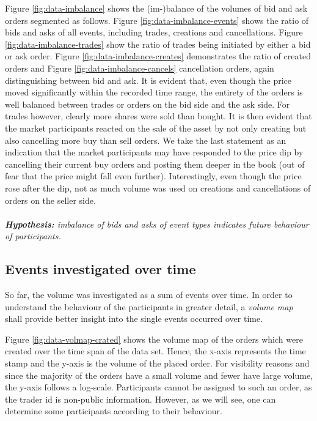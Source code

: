 Figure \ref{fig:data-imbalance} shows the (im-)balance of the volumes of bid and ask orders segmented as follows.
Figure \ref{fig:data-imbalance-events} shows the ratio of bids and asks of all events, including trades, creations and cancellations. 
Figure \ref{fig:data-imbalance-trades} show the ratio of trades being initiated by either a bid or ask order.
Figure \ref{fig:data-imbalance-creates} demonstrates the ratio of created orders and Figure \ref{fig:data-imbalance-cancels} cancellation orders, again distinguishing between bid and ask.
It is evident that, even though the price moved significantly within the recorded time range, the entirety of the orders is well balanced between trades or orders on the bid side and the ask side.
For trades however, clearly more shares were sold than bought.
It is then evident that the market participants reacted on the sale of the asset by not only creating but also cancelling more buy than sell orders.
We take the last statement as an indication that the market participants may have responded to the price dip by cancelling their current buy orders and posting them deeper in the book (out of fear that the price might fall even further).
Interestingly, even though the price rose after the dip, not as much volume was used on creations and cancellations of orders on the seller side.
\\
\\
\textit{\textbf{Hypothesis:} imbalance of bids and asks of event types indicates future behaviour of participants.}

\subsection{Events investigated over time}

So far, the volume was investigated as a sum of events over time.
In order to understand the behaviour of the participants in greater detail, a \textit{volume map} shall provide better insight into the single events occurred over time.

Figure \ref{fig:data-volmap-crated} shows the volume map of the orders which were created over the time span of the data set.
Hence, the x-axis represents the time stamp and the y-axis is the volume of the placed order.
For visibility reasons and since the majority of the orders have a small volume and fewer have large volume, the y-axis follows a log-scale.
Participants cannot be assigned to such an order, as the trader id is non-public information.
However, as we will see, one can determine some participants according to their behaviour.

